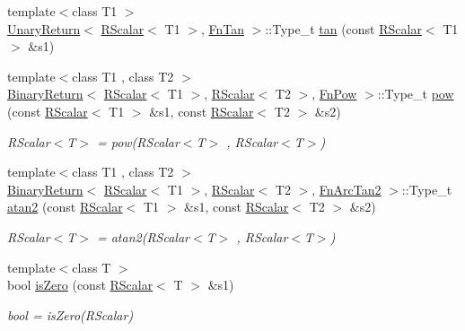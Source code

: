 \begin{DoxyCompactItemize}
\item 
{\footnotesize template$<$class T1 $>$ }\\\mbox{\hyperlink{structENSEM_1_1UnaryReturn}{Unary\+Return}}$<$ \mbox{\hyperlink{classENSEM_1_1RScalar}{R\+Scalar}}$<$ T1 $>$, \mbox{\hyperlink{structENSEM_1_1FnTan}{Fn\+Tan}} $>$\+::Type\+\_\+t \mbox{\hyperlink{group__rscalar_ga84dc4a2763ad7c0adb4af839501c4c99}{tan}} (const \mbox{\hyperlink{classENSEM_1_1RScalar}{R\+Scalar}}$<$ T1 $>$ \&s1)
\item 
{\footnotesize template$<$class T1 , class T2 $>$ }\\\mbox{\hyperlink{structENSEM_1_1BinaryReturn}{Binary\+Return}}$<$ \mbox{\hyperlink{classENSEM_1_1RScalar}{R\+Scalar}}$<$ T1 $>$, \mbox{\hyperlink{classENSEM_1_1RScalar}{R\+Scalar}}$<$ T2 $>$, \mbox{\hyperlink{structENSEM_1_1FnPow}{Fn\+Pow}} $>$\+::Type\+\_\+t \mbox{\hyperlink{group__rscalar_gae9777be3e406f64a9a70f5a97526102a}{pow}} (const \mbox{\hyperlink{classENSEM_1_1RScalar}{R\+Scalar}}$<$ T1 $>$ \&s1, const \mbox{\hyperlink{classENSEM_1_1RScalar}{R\+Scalar}}$<$ T2 $>$ \&s2)
\begin{DoxyCompactList}\small\item\em R\+Scalar$<$\+T$>$ = pow(\+R\+Scalar$<$\+T$>$ , R\+Scalar$<$\+T$>$) \end{DoxyCompactList}\item 
{\footnotesize template$<$class T1 , class T2 $>$ }\\\mbox{\hyperlink{structENSEM_1_1BinaryReturn}{Binary\+Return}}$<$ \mbox{\hyperlink{classENSEM_1_1RScalar}{R\+Scalar}}$<$ T1 $>$, \mbox{\hyperlink{classENSEM_1_1RScalar}{R\+Scalar}}$<$ T2 $>$, \mbox{\hyperlink{structENSEM_1_1FnArcTan2}{Fn\+Arc\+Tan2}} $>$\+::Type\+\_\+t \mbox{\hyperlink{group__rscalar_ga855c0e6f402b471f9ddfc04245e0b910}{atan2}} (const \mbox{\hyperlink{classENSEM_1_1RScalar}{R\+Scalar}}$<$ T1 $>$ \&s1, const \mbox{\hyperlink{classENSEM_1_1RScalar}{R\+Scalar}}$<$ T2 $>$ \&s2)
\begin{DoxyCompactList}\small\item\em R\+Scalar$<$\+T$>$ = atan2(\+R\+Scalar$<$\+T$>$ , R\+Scalar$<$\+T$>$) \end{DoxyCompactList}\item 
{\footnotesize template$<$class T $>$ }\\bool \mbox{\hyperlink{group__rscalar_gad963fef363cb9cc2ca365a068821a5ff}{is\+Zero}} (const \mbox{\hyperlink{classENSEM_1_1RScalar}{R\+Scalar}}$<$ T $>$ \&s1)
\begin{DoxyCompactList}\small\item\em bool = is\+Zero(\+R\+Scalar) \end{DoxyCompactList}\item 

\end{DoxyCompactItemize}
